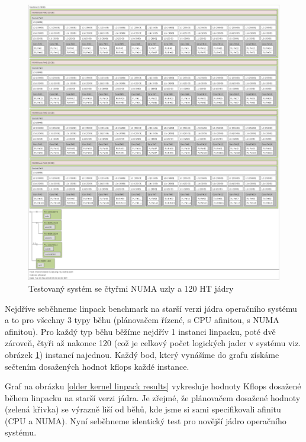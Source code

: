 \documentclass[
  master=true,
  font=sans,
  printversion=false,
  joinlists=true,
  figures=true,
  tables=true,
  sourcecodes=false,
  theorems=false,
  bibencoding=utf8,
  language=czech,
  encoding=utf8,
  field=ainfk,
  biblatex,
  glossaries,
  index
]{kidiplom}
\begin{document}
\begin{figure}[p]
\includegraphics[scale=0.2]{obrazky/lsTOPO-brickland.png}
\caption{Testovaný systém se čtyřmi NUMA uzly a 120 HT jádry}
\label{4 numa NODE system scheme}
\end{figure}


Nejdříve seběhneme linpack benchmark na starší verzi jádra operačního systému a to pro všechny 3 typy běhu (plánovačem řízené, s CPU afinitou, s NUMA afinitou). Pro každý typ běhu běžíme nejdřív 1 instanci linpacku, poté dvě zároveň, čtyři až nakonec 120 (což je celkový počet logických jader v systému viz. obrázek \ref{4 numa NODE system scheme}) instancí najednou. Každý bod, který vynášíme do grafu získáme sečtením dosažených hodnot kflops každé instance.

\newpage

Graf na obrázku \ref{older kernel linpack results} vykresluje hodnoty Kflops dosažené během linpacku na starší verzi jádra. Je zřejmé, že plánovačem dosažené hodnoty (zelená křivka) se výrazně liší od běhů, kde jsme si sami specifikovali afinitu (CPU a NUMA). Nyní seběhneme identický test pro novější jádro operačního systému.
\end{document}
